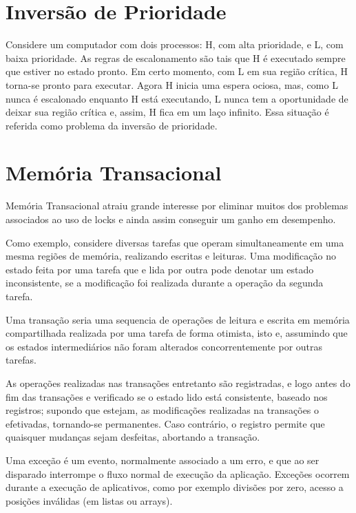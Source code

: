 \section{Inversão de Prioridade}

Considere um computador com dois processos: H, com alta prioridade, e L, com baixa prioridade. 
As regras de escalonamento são tais que H é executado sempre que estiver no estado pronto. 
Em certo momento, com L em sua região crítica, H torna-se pronto para executar. Agora H inicia 
uma espera ociosa, mas, como L nunca é escalonado enquanto H está executando, L nunca tem a 
oportunidade de deixar sua região crítica e, assim, H fica em um laço infinito. Essa situação 
é referida como problema da inversão de prioridade.

\section{Memória Transacional}

Memória Transacional atraiu
 grande interesse por eliminar muitos dos problemas associados ao uso de locks
 e ainda assim conseguir um ganho em desempenho.


Como exemplo, considere diversas tarefas que operam simultaneamente em uma mesma regiões 
de memória, realizando escritas e leituras. Uma modificação no estado feita por uma tarefa 
que e lida por outra pode denotar um estado inconsistente, se a modificação foi realizada 
durante a operação da segunda tarefa.

Uma transação seria uma sequencia de operações de leitura e escrita em memória compartilhada 
realizada por uma tarefa de forma otimista, isto e, assumindo que os estados intermediários 
não foram alterados
 concorrentemente por outras tarefas.


As operações realizadas nas transações entretanto são registradas, e logo antes do fim das 
transações e verificado se o estado lido está consistente, baseado nos registros; supondo 
que estejam, as modificações realizadas na transações o efetivadas, tornando-se permanentes. 
Caso contrário, o registro permite que quaisquer mudanças sejam desfeitas, abortando a transação.



Uma exceção é um evento, normalmente associado a um erro, e que ao ser disparado interrompe o 
fluxo normal de execução da aplicação. Exceções ocorrem durante a execução de aplicativos, como 
por exemplo divisões por zero, acesso a posições inválidas (em listas ou arrays).


